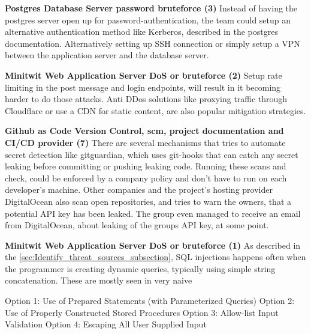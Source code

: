 \textbf{Postgres Database Server password bruteforce (3)}
Instead of having the postgres server open up for password-authentication, the team could setup an alternative authentication method like Kerberos, described in the postgres documentation\cite{postgres_auth_methods}.
Alternatively setting up SSH connection or simply setup a VPN between the application server and the database server.

\textbf{Minitwit Web Application Server DoS or bruteforce (2)}
Setup rate limiting in the post message and login endpoints, will result in it becoming harder to do those attacks. Anti DDos solutions like proxying traffic through Cloudflare or use a CDN for static content, are also popular mitigation strategies.\cite{owasp_dos_mitigation }

\textbf{Github as Code Version Control, \acrshort{scm}, project documentation and CI/CD provider (7)}
There are several mechanisms that tries to automate secret detection like gitguardian\cite{gitguardian}, which uses git-hooks that can catch any secret leaking before committing or pushing leaking code. Running these scans and check, could be enforced by a company policy and don't have to run on each developer's machine. Other companies and the project's hosting provider DigitalOcean also scan open repositories, and tries to warn the owners, that a potential API key has been leaked.\cite{github_do_scanning_partner} The group even managed to receive an email from DigitalOcean, about leaking of the groups API key, at some point.  

\textbf{Minitwit Web Application Server DoS or bruteforce (1)}
As described in the \autoref{sec:Identify_threat_sources_subsection}, SQL injections happens often when the programmer is creating dynamic queries, typically using simple string concatenation. These are mostly seen in very naive 


    Option 1: Use of Prepared Statements (with Parameterized Queries)
    Option 2: Use of Properly Constructed Stored Procedures
    Option 3: Allow-list Input Validation
    Option 4: Escaping All User Supplied Input






